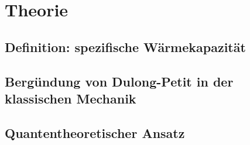 \section{Theorie}
\label{sec:Theorie}
\subsection{Definition: spezifische Wärmekapazität}
\subsection{Bergündung von Dulong-Petit in der klassischen Mechanik}
\subsection{Quantentheoretischer Ansatz}
